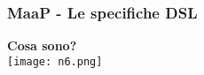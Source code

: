 \begin{frame}
  \frametitle{MaaP - Le specifiche DSL}
  \textbf{Cosa sono?}\\
  \centering
  \texttt{[image: n6.png]}
\end{frame}


